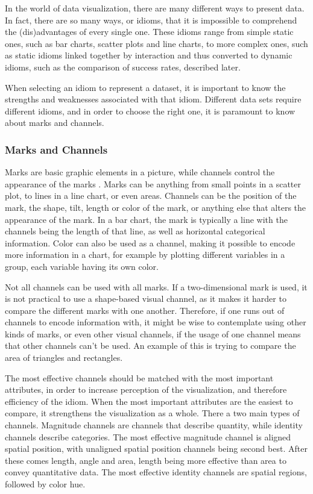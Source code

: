 \documentclass[Report.tex]{subfiles}
\begin{document}
In the world of data visualization, there are many different ways to present
data. In fact, there are so many ways, or idioms, that it is impossible to
comprehend the (dis)advantages of every single one. These idioms range from
simple static ones, such as bar charts, scatter plots and line charts, to
more complex ones, such as static idioms linked together by interaction and thus converted to dynamic idioms,
such as the comparison of success rates, described later. 

When selecting an idiom to represent a dataset, it is important to know the
strengths and weaknesses associated with that idiom. Different data sets
require different idioms, and in order to choose the right one, it is paramount
to know about marks and channels. 

\subsubsection{Marks and Channels}
Marks are basic graphic elements in a picture, while channels control the
appearance of the marks \cite[Chapter 5, p. 95-96]{Tamara}. Marks can be anything 
from small points in a scatter plot, to lines in a line
chart, or even areas. Channels can be the position of the mark, the shape, tilt,
length or color of the mark, or anything else that alters the appearance of the
mark.
In a bar chart, the mark is typically a line with the channels being the length
of that line, as well as horizontal categorical information. Color can also be used as a channel,
making it possible to encode more information in a chart, for example by
plotting different variables in a group, each variable having its own color. 

Not all channels can be used with all marks. If a two-dimensional mark is used, 
it is not practical to use a shape-based visual channel, as it makes it
harder to compare the different marks with one another. Therefore, if one runs out
of channels to encode information with, it might be wise to contemplate using
other kinds of marks, or even other visual channels, if the usage of one channel
means that other channels can't be used. An example of this is trying to compare 
the area of triangles and rectangles.

The most effective channels should be matched with the most important
attributes, in order to increase perception of the visualization, and therefore
efficiency of the idiom. When the most important attributes are the easiest to
compare, it strengthens the visualization as a whole. 
There a two main types of channels. Magnitude channels are channels that describe quantity, 
while identity channels describe categories.
The most effective magnitude channel is
aligned spatial position, with unaligned spatial position channels being second
best. After these comes length, angle and area,
length being more effective than area to convey quantitative data. 
The most effective identity channels are
spatial regions, followed by color hue\cite[Chapter 5, p. 101]{Tamara}.
\end{document}
